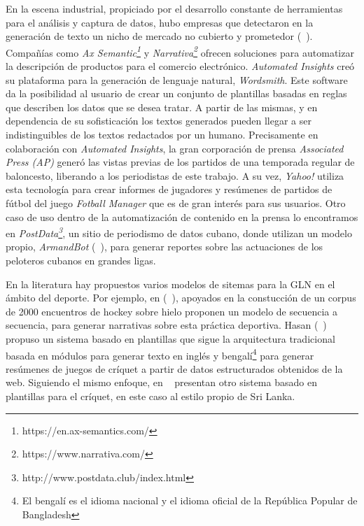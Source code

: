     En la escena industrial, propiciado por el desarrollo constante de herramientas para el análisis y captura de datos,
hubo empresas que detectaron en la generación de texto un nicho de mercado no cubierto y prometedor (~\cite{dale2020natural}). Compañías como \textit{Ax Semantic\footnote[1]{https://en.ax-semantics.com/}} y 
\textit{Narrativa\footnote[2]{https://www.narrativa.com/}} ofrecen soluciones para automatizar la descripción de productos para el comercio electrónico. 
\textit{Automated Insights} creó su plataforma para la generación de lenguaje natural, \textit{Wordsmith}. Este software da la posibilidad al usuario de crear un conjunto 
de plantillas basadas en reglas que describen los datos que se desea tratar. A partir de las mismas, y en dependencia de su sofisticación los textos generados pueden llegar a ser 
indistinguibles de los textos redactados por un humano. Precisamente en colaboración con \textit{Automated Insights}, la gran corporación de prensa \textit{Associated Press (AP)} generó
las vistas previas de los partidos de una temporada regular de baloncesto, liberando a los periodistas de este trabajo. A su vez, \textit{Yahoo!} utiliza esta tecnología para crear informes 
de jugadores y resúmenes de partidos de fútbol del juego \textit{Fotball Manager} que es de gran interés para sus usuarios. Otro caso de uso dentro de la automatización de contenido en la prensa lo encontramos en
\textit{PostData\footnote[3]{http://www.postdata.club/index.html}}, un sitio de periodismo 
de datos cubano, donde utilizan un modelo propio, \textit{ArmandBot} (~\cite{balboa2020}), para generar reportes sobre las actuaciones de los peloteros cubanos en grandes ligas.

    En la literatura hay propuestos varios modelos de sitemas para la GLN en el ámbito del deporte. Por ejemplo, en (~\cite{kanerva2019template}), apoyados en la constucción de un corpus de 2000 encuentros de hockey sobre hielo 
proponen un modelo de secuencia a secuencia, para generar narrativas sobre esta práctica deportiva. Hasan (~\cite{hasan2011automatic}) propuso un sistema basado en plantillas que sigue la arquitectura tradicional basada en módulos para 
generar texto en inglés y bengalí\footnote[5]{El bengalí es el idioma nacional y el idioma oficial de la República Popular de Bangladesh} para generar resúmenes de juegos de críquet a partir de datos estructurados obtenidos de la web. 
Siguiendo el mismo enfoque, en ~\cite{gu2016incorporating} presentan otro sistema basado en plantillas para el críquet, en este caso al estilo propio de Sri Lanka.
 
